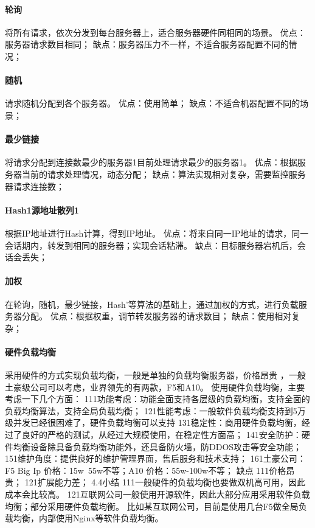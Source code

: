 \paragraph*{轮询}
将所有请求，依次分发到每台服务器上，适合服务器硬件同相同的场景。
优点：服务器请求数目相同；
缺点：服务器压力不一样，不适合服务器配置不同的情况；
\paragraph*{随机}
请求随机分配到各个服务器。
优点：使用简单；
缺点：不适合机器配置不同的场景；
\paragraph*{最少链接}
将请求分配到连接数最少的服务器1目前处理请求最少的服务器1。
优点：根据服务器当前的请求处理情况，动态分配；
缺点：算法实现相对复杂，需要监控服务器请求连接数；
\paragraph*{Hash1源地址散列1}
根据IP地址进行Hash计算，得到IP地址。
优点：将来自同一IP地址的请求，同一会话期内，转发到相同的服务器；实现会话粘滞。
缺点：目标服务器宕机后，会话会丢失；
\paragraph*{加权}
在轮询，随机，最少链接，Hash’等算法的基础上，通过加权的方式，进行负载服务器分配。
优点：根据权重，调节转发服务器的请求数目；
缺点：使用相对复杂；
\paragraph*{硬件负载均衡}
采用硬件的方式实现负载均衡，一般是单独的负载均衡服务器，价格昂贵
，一般土豪级公司可以考虑，业界领先的有两款，F5和A10。
使用硬件负载均衡，主要考虑一下几个方面：
111功能考虑：功能全面支持各层级的负载均衡，支持全面的负载均衡算法，支持全局负载均衡；
121性能考虑：一般软件负载均衡支持到5万级并发已经很困难了，硬件负载均衡可以支持
131稳定性：商用硬件负载均衡，经过了良好的严格的测试，从经过大规模使用，在稳定性方面高；
141安全防护：硬件均衡设备除具备负载均衡功能外，还具备防火墙，防DDOS攻击等安全功能；
151维护角度：提供良好的维护管理界面，售后服务和技术支持；
161土豪公司：F5 Big Ip 价格：15w~55w不等；A10 价格：55w-100w不等；
缺点
111价格昂贵；
121扩展能力差；
4.4小结
111一般硬件的负载均衡也要做双机高可用，因此成本会比较高。
121互联网公司一般使用开源软件，因此大部分应用采用软件负载均衡；部分采用硬件负载均衡。
比如某互联网公司，目前是使用几台F5做全局负载均衡，内部使用Nginx等软件负载均衡。
